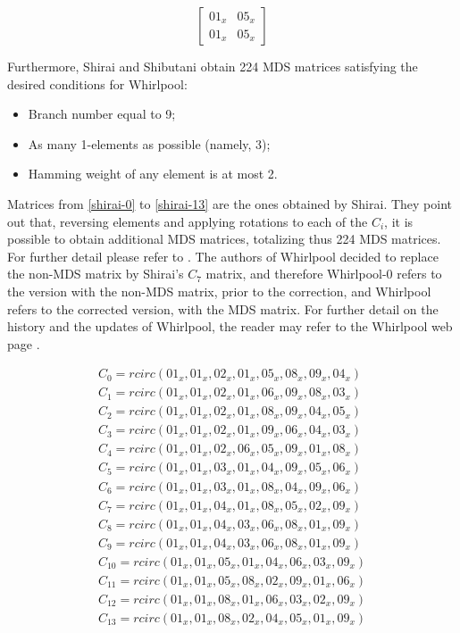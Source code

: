 \begin{equation}\label{mat:singular-whirlpool}
\begin{bmatrix}
  01_x & 05_x\\
  01_x & 05_x
\end{bmatrix}
\end{equation}

Furthermore, Shirai and Shibutani obtain 224 MDS matrices satisfying the desired conditions for Whirlpool:
\begin{itemize}
  \item Branch number equal to 9;
  \item As many 1-elements as possible (namely, 3);
  \item Hamming weight of any element is at most 2.
\end{itemize}

Matrices from \eqref{shirai-0} to \eqref{shirai-13} are the ones obtained by Shirai. They point out that, reversing elements and applying rotations to each of the $C_i$, it is possible to obtain additional MDS matrices, totalizing thus 224 MDS matrices. For further detail please refer to \cite{Shirai2003}. The authors of Whirlpool decided to replace the non-MDS matrix by Shirai's $C_7$ matrix, and therefore Whirlpool-0 refers to the version with the non-MDS matrix, prior to the correction, and Whirlpool refers to the corrected version, with the MDS matrix. For further detail on the history and the updates of Whirlpool, the reader may refer to the Whirlpool web page \cite{WhirlpoolWebPage}.

\begin{gather}
C_0 = rcirc(01_x, 01_x, 02_x, 01_x, 05_x, 08_x, 09_x, 04_x)\label{shirai-0}\\
C_1 = rcirc(01_x, 01_x, 02_x, 01_x, 06_x, 09_x, 08_x, 03_x)\label{shirai-1}\\
C_2 = rcirc(01_x, 01_x, 02_x, 01_x, 08_x, 09_x, 04_x, 05_x)\label{shirai-2}\\
C_3 = rcirc(01_x, 01_x, 02_x, 01_x, 09_x, 06_x, 04_x, 03_x)\label{shirai-3}\\
C_4 = rcirc(01_x, 01_x, 02_x, 06_x, 05_x, 09_x, 01_x, 08_x)\label{shirai-4}\\
C_5 = rcirc(01_x, 01_x, 03_x, 01_x, 04_x, 09_x, 05_x, 06_x)\label{shirai-5}\\
C_6 = rcirc(01_x, 01_x, 03_x, 01_x, 08_x, 04_x, 09_x, 06_x)\label{shirai-6}\\
C_7 = rcirc(01_x, 01_x, 04_x, 01_x, 08_x, 05_x, 02_x, 09_x)\label{shirai-7}\\
C_8 = rcirc(01_x, 01_x, 04_x, 03_x, 06_x, 08_x, 01_x, 09_x)\label{shirai-8}\\
C_9 = rcirc(01_x, 01_x, 04_x, 03_x, 06_x, 08_x, 01_x, 09_x)\label{shirai-9}\\
C_{10} = rcirc(01_x, 01_x, 05_x, 01_x, 04_x, 06_x, 03_x, 09_x)\label{shirai-10}\\
C_{11} = rcirc(01_x, 01_x, 05_x, 08_x, 02_x, 09_x, 01_x, 06_x)\label{shirai-11}\\
C_{12} = rcirc(01_x, 01_x, 08_x, 01_x, 06_x, 03_x, 02_x, 09_x)\label{shirai-12}\\
C_{13} = rcirc(01_x, 01_x, 08_x, 02_x, 04_x, 05_x, 01_x, 09_x)\label{shirai-13}
\end{gather}
